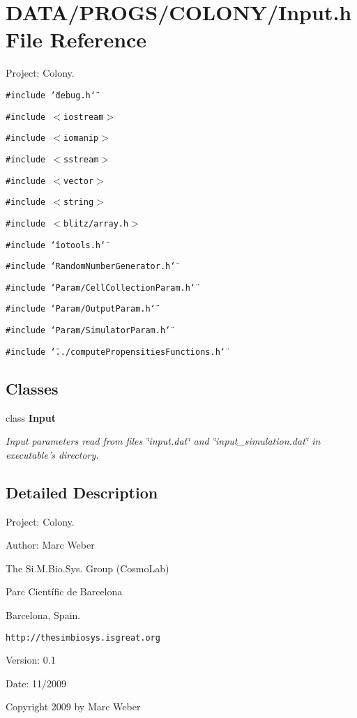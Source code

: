\section{DATA/PROGS/COLONY/Input.h File Reference}
\label{Input_8h}
Project: Colony. 

{\tt \#include \char`\"{}debug.h\char`\"{}}\par
{\tt \#include $<$iostream$>$}\par
{\tt \#include $<$iomanip$>$}\par
{\tt \#include $<$sstream$>$}\par
{\tt \#include $<$vector$>$}\par
{\tt \#include $<$string$>$}\par
{\tt \#include $<$blitz/array.h$>$}\par
{\tt \#include \char`\"{}iotools.h\char`\"{}}\par
{\tt \#include \char`\"{}RandomNumberGenerator.h\char`\"{}}\par
{\tt \#include \char`\"{}Param/CellCollectionParam.h\char`\"{}}\par
{\tt \#include \char`\"{}Param/OutputParam.h\char`\"{}}\par
{\tt \#include \char`\"{}Param/SimulatorParam.h\char`\"{}}\par
{\tt \#include \char`\"{}../computePropensitiesFunctions.h\char`\"{}}\par
\subsection*{Classes}
\begin{CompactItemize}
\item 
class {\bf Input}
\begin{CompactList}\small\item\em Input parameters read from files \char`\"{}input.dat\char`\"{} and \char`\"{}input\_\-simulation.dat\char`\"{} in executable's directory. \item\end{CompactList}\end{CompactItemize}


\subsection{Detailed Description}
Project: Colony. 

\begin{Desc}
\item[Author:]Marc Weber\par
 The Si.M.Bio.Sys. Group (CosmoLab)\par
 Parc Científic de Barcelona\par
 Barcelona, Spain.\par
 {\tt http://thesimbiosys.isgreat.org} \end{Desc}
\begin{Desc}
\item[Version:]0.1 \end{Desc}
\begin{Desc}
\item[Date:]11/2009\end{Desc}
Copyright 2009 by Marc Weber 